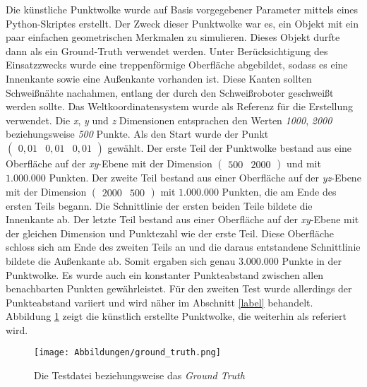 Die künstliche Punktwolke wurde auf Basis vorgegebener Parameter mittels eines Python-Skriptes erstellt. Der Zweck dieser Punktwolke war es, ein Objekt mit ein paar einfachen geometrischen Merkmalen zu simulieren. Dieses Objekt durfte dann als ein Ground-Truth verwendet werden. Unter Berücksichtigung des Einsatzzwecks wurde eine treppenförmige Oberfläche abgebildet, sodass es eine Innenkante sowie eine Außenkante vorhanden ist. Diese Kanten sollten Schweißnähte nachahmen, entlang der durch den Schweißroboter geschweißt werden sollte. Das Weltkoordinatensystem wurde als Referenz für die Erstellung verwendet. Die \textit{x}, \textit{y} und \textit{z} Dimensionen entsprachen den Werten \textit{1000}, \textit{2000} beziehungsweise \textit{500} Punkte. Als den Start wurde der Punkt $\left(\begin{smallmatrix}
	0,01 & 0,01 & 0,01
\end{smallmatrix}\right)$ gewählt. Der erste Teil der Punktwolke bestand aus eine Oberfläche auf der \textit{xy}-Ebene mit der Dimension $\left(\begin{smallmatrix}
500 & 2000
\end{smallmatrix}\right)$ und mit $1.000.000$ Punkten. Der zweite Teil bestand aus einer Oberfläche auf der \textit{yz}-Ebene mit der Dimension $\left(\begin{smallmatrix}
2000 & 500
\end{smallmatrix}\right)$ mit $1.000.000$ Punkten, die am Ende des ersten Teils begann. Die Schnittlinie der ersten beiden Teile bildete die Innenkante ab. Der letzte Teil bestand aus einer Oberfläche auf der \textit{xy}-Ebene mit der gleichen Dimension und Punktezahl wie der erste Teil. Diese Oberfläche schloss sich am Ende des zweiten Teils an und die daraus entstandene Schnittlinie bildete die Außenkante ab. Somit ergaben sich genau $3.000.000$ Punkte in der Punktwolke. Es wurde auch ein konstanter Punkteabstand zwischen allen benachbarten Punkten gewährleistet. Für den zweiten Test wurde allerdings der Punkteabstand variiert und wird näher im Abschnitt \ref{label} behandelt. Abbildung \ref{fig: ground_truth} zeigt die künstlich erstellte Punktwolke, die weiterhin als \testcloud referiert wird. 

\begin{figure}[t]
	\texttt{[image: Abbildungen/ground\_truth.png]}
	\centering
	\caption[ground truth]{Die Testdatei beziehungsweise das \textit{Ground Truth}}
	\label{fig: ground_truth}
\end{figure}

